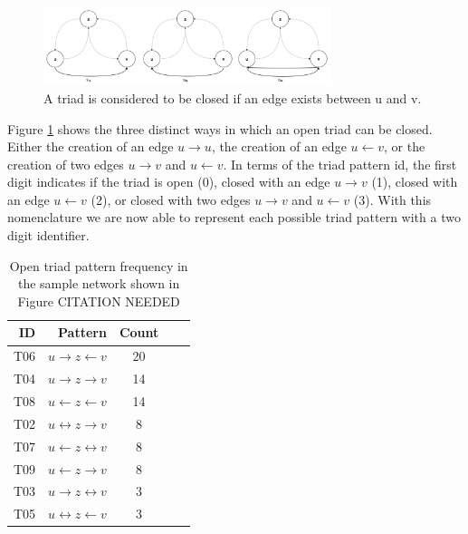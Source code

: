 \begin{figure}[H]
  \centering
  \includegraphics[width=0.75\textwidth]{images/thesis_closed_triads.png}
  \caption[closed triad patterns]{A triad is considered to be closed if an edge exists between u and v.}
  \label{thesis_closed_triads}
\end{figure}

Figure \ref{thesis_closed_triads} shows the three distinct ways in which an open triad can be closed. Either the creation of an edge $u \rightarrow u$, the creation of an edge $u \leftarrow v$, or the creation of two edges $u \rightarrow v$ and $u \leftarrow v$. In terms of the triad pattern id, the first digit indicates if the triad is open (0), closed with an edge $u \rightarrow v$ (1), closed with an edge $u \leftarrow v$ (2), or closed with two edges $u \rightarrow v$ and $u \leftarrow v$ (3). With this nomenclature we are now able to represent each possible triad pattern with a two digit identifier. 

\begin{table}[t]
\caption{Open triad pattern frequency in the sample network shown in Figure CITATION NEEDED}
\label{sample_network_freq}
\vskip 0.15in
\begin{center}
\begin{small}
\begin{sc}
\begin{tabular}{rrccr}
\hline
ID & Pattern & Count \\
\hline
T06 & $u \rightarrow z \leftarrow v $ & 20 \\
T04 &$ u \rightarrow z \rightarrow v$ & 14 \\
T08 & $u \leftarrow z \leftarrow v$ & 14 \\
T02 & $u \leftrightarrow z \rightarrow v$ & 8 \\
T07 & $u \leftarrow z \leftrightarrow v$ & 8 \\
T09 & $u \leftarrow z \rightarrow v$ & 8 \\
T03 & $u \rightarrow z \leftrightarrow v$ & 3 \\
T05 & $u \leftrightarrow z \leftarrow v$ & 3 \\

\hline
\end{tabular}
\end{sc}
\end{small}
\end{center}
\vskip -0.1in
\end{table}


